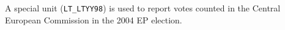 A special unit (\texttt{LT\_LTYY98}) is used to report votes counted in the Central European 
Commission in the 2004 EP election.